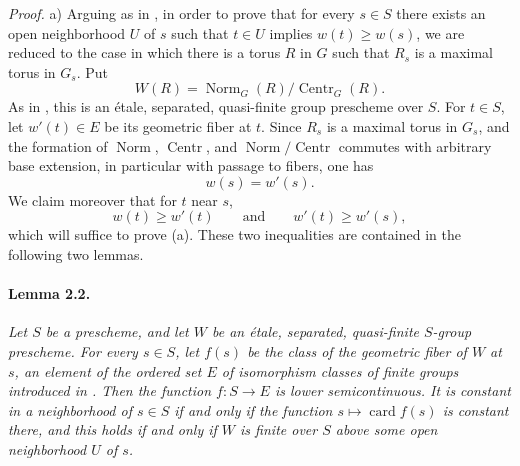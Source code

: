 \emph{Proof.}
a) Arguing as in , in order to prove that for every \(s\in S\)
there exists an open neighborhood \(U\) of \(s\) such that
\(t\in U\) implies \(w(t)\geq w(s)\), we are reduced to the case in
which there is a torus \(R\) in \(G\) such that \(R_s\) is a maximal
torus in \(G_s\). Put
\[
  W(R)=\operatorname{Norm}_G(R)/\operatorname{Centr}_G(R).
\]
As in , this is an étale, separated, quasi-finite group
prescheme over \(S\). For \(t\in S\), let \(w'(t)\in E\) be its
geometric fiber at \(t\). Since \(R_s\) is a maximal torus in \(G_s\),
and the formation of \(\operatorname{Norm}\),
\(\operatorname{Centr}\), and
\(\operatorname{Norm}/\operatorname{Centr}\) commutes with arbitrary
base extension, in particular with passage to fibers, one has
\[
  w(s)=w'(s).
\]
We claim moreover that for \(t\) near \(s\),
\[
  w(t)\geq w'(t)
  \qquad\text{and}\qquad
  w'(t)\geq w'(s),
\]
which will suffice to prove (a). These two inequalities are contained
in the following two lemmas.

\paragraph{\textbf{Lemma 2.2.}}
\emph{Let \(S\) be a prescheme, and let \(W\) be an étale,
separated, quasi-finite \(S\)-group prescheme. For every \(s\in S\),
let \(f(s)\) be the class of the geometric fiber of \(W\) at \(s\),
an element of the ordered set \(E\) of isomorphism classes of finite
groups introduced in . Then the function
\(f:S\to E\) is lower semicontinuous. It is constant in a
neighborhood of \(s\in S\) if and only if the function
\(s\mapsto\operatorname{card}f(s)\) is constant there, and this holds
if and only if \(W\) is finite over \(S\) above some open
neighborhood \(U\) of \(s\).}

